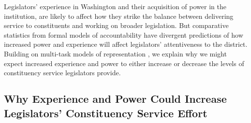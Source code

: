 \documentclass[12pt]{article}
\begin{document}
Legislators' experience in Washington and their acquisition of power in the institution, are likely to affect how they strike the balance between delivering service to constituents and working on broader legislation.  But comparative statistics from formal models of accountability have divergent predictions of how increased power and experience will affect legislators' attentiveness to the district.  Building on multi-task models of representation \cite{AshworthBuenodeMesquita2006, gordon2009advantages}, we explain why we might expect increased experience and power to either increase or decrease the levels of constituency service legislators provide.  




\subsection{Why Experience and Power Could Increase Legislators' Constituency Service Effort}

\end{document}
